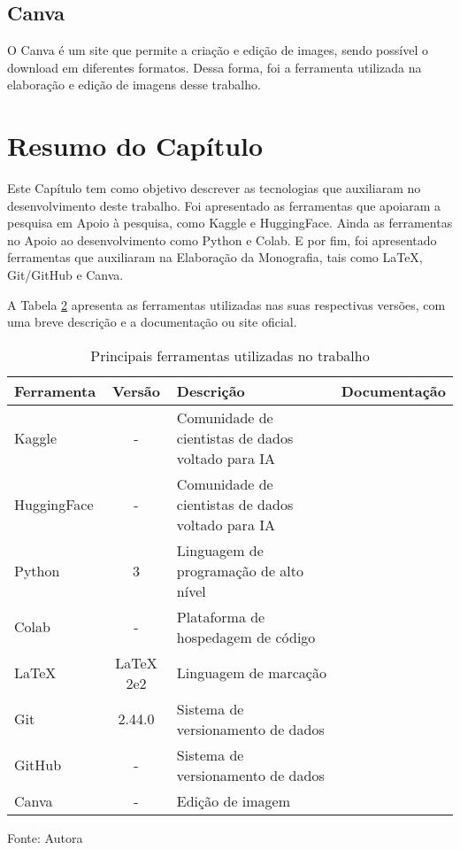 \subsection{Canva}\label{subsec:canva}
O Canva é um site que permite a criação e edição de images, sendo possível o download em diferentes formatos.
Dessa forma, foi a ferramenta utilizada na elaboração e edição de imagens desse trabalho. \cite{canva}

\section{Resumo do Capítulo}\label{sec:resumosuptec}
Este Capítulo tem como objetivo descrever as tecnologias que auxiliaram no desenvolvimento deste trabalho. Foi apresentado
as ferramentas que apoiaram a pesquisa em Apoio à pesquisa, como Kaggle e HuggingFace. Ainda as ferramentas no Apoio ao
desenvolvimento como Python e Colab. E por fim, foi apresentado ferramentas que auxiliaram na Elaboração da Monografia, tais
como LaTeX, Git/GitHub e Canva.

A Tabela \hyperref[tab:2]{2} apresenta as ferramentas utilizadas nas suas respectivas versões, com uma breve descrição e a documentação ou site 
oficial.

\begin{table}[htbp]
    \centering
    \begin{threeparttable}
        \caption{Principais ferramentas utilizadas no trabalho}
        \label{tab:2}
        \begin{tabular}{>{\centering\arraybackslash}m{3cm} c m{5cm} c}
        \toprule 
        Ferramenta & Versão & Descrição & Documentação \\
        \midrule
        Kaggle & - & Comunidade de cientistas de dados voltado para IA & \cite{kagglesite} \\
        \hline 
        HuggingFace & - & Comunidade de cientistas de dados voltado para IA & \cite{huggingsite} \\
        \hline 
        Python & 3 & Linguagem de programação de alto nível & \cite{pythonsite} \\
        \hline 
        Colab & - & Plataforma de hospedagem de código & \cite{colabsite} \\
        \hline 
        LaTeX & LaTeX 2e2 & Linguagem de marcação & \cite{latexsite} \\
        \hline 
        Git & 2.44.0 & Sistema de versionamento de dados & \cite{gitsite} \\
        \hline 
        GitHub & - & Sistema de versionamento de dados & \cite{githubsite} \\
        \hline 
        Canva & - & Edição de imagem & \cite{canva} \\
        \bottomrule 
        \end{tabular}
        \begin{tablenotes}
            \small
            \centering
            \item Fonte: Autora
        \end{tablenotes}
    \end{threeparttable}
\end{table}
